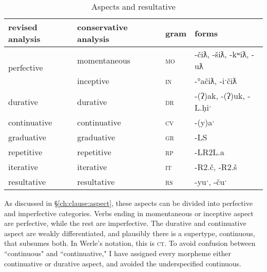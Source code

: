 \begin{table}[ht]
\centering
\caption{Aspects and resultative}
\label{table:aspects}
\begin{tabular}{llll}
revised analysis & conservative analysis & gram                    & forms                                                         \\ \hline
\multicolumn{1}{|l|}{\multirow{2}{*}{perfective}}   & \multicolumn{1}{l|}{momentaneous} & \multicolumn{1}{l|}{\textsc{mo}} & \multicolumn{1}{l|}{-čiƛ, -šiƛ, -kʷiƛ, -uƛ}                 \\ \cline{2-4} 
\multicolumn{1}{|l|}{}                            & \multicolumn{1}{l|}{inceptive}    & \multicolumn{1}{l|}{\textsc{in}} & \multicolumn{1}{l|}{-°ačiƛ, -iˑčiƛ}                         \\ \hline
\multicolumn{1}{|l|}{durative}                    & \multicolumn{1}{l|}{durative}     & \multicolumn{1}{l|}{\textsc{dr}} & \multicolumn{1}{l|}{-(ʔ)ak, -(ʔ)uk, -L.ḥiˑ}  \\ \hline
\multicolumn{1}{|l|}{continuative}                & \multicolumn{1}{l|}{continuative} & \multicolumn{1}{l|}{\textsc{cv}} & \multicolumn{1}{l|}{-(y)aˑ}                   \\ \hline
\multicolumn{1}{|l|}{graduative}                     & \multicolumn{1}{l|}{graduative}   & \multicolumn{1}{l|}{\textsc{gr}} & \multicolumn{1}{l|}{-LS}                        \\ \hline
\multicolumn{1}{|l|}{repetitive}                  & \multicolumn{1}{l|}{repetitive}   & \multicolumn{1}{l|}{\textsc{rp}} & \multicolumn{1}{l|}{-LR2L.a}                   \\ \hline
\multicolumn{1}{|l|}{iterative}                  & \multicolumn{1}{l|}{iterative}    & \multicolumn{1}{l|}{\textsc{it}} & \multicolumn{1}{l|}{-R2.č, -R2.š} \\ \hline \hline
\multicolumn{1}{|l|}{resultative}                 & \multicolumn{1}{l|}{resultative}  & \multicolumn{1}{l|}{\textsc{rs}} & \multicolumn{1}{l|}{-yuˑ, -čuˑ}              \\ \hline
\end{tabular}
\end{table}

As discussed in \S\ref{ch:clause:aspect}, these aspects can be divided into perfective and imperfective categories. Verbs ending in momentaneous or inceptive aspect are perfective, while the rest are imperfective. The durative and continuative aspect are weakly differentiated, and plausibly there is a supertype, continuous, that subsumes both. In Werle's notation, this is \textsc{ct}. To avoid confusion between ``continuous" and ``continuative," I have assigned every morpheme either continuative or durative aspect, and avoided the underspecified continuous.



